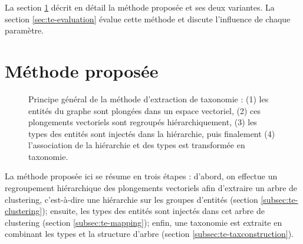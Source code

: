 La section \ref{sec:te-method} décrit en détail la méthode proposée et ses deux variantes. La section \ref{sec:te-evaluation} évalue cette méthode et discute l'influence de chaque paramètre.

\section{Méthode proposée}
\label{sec:te-method}

\begin{figure}[h]
    \centering
    
    \caption[Principe général de l'extraction de taxonomie]{Principe général de la méthode d'extraction de taxonomie : (1) les entités du graphe sont plongées dans un espace vectoriel, (2) ces plongements vectoriels sont regroupés hiérarchiquement, (3) les types des entités sont injectés dans la hiérarchie, puis finalement (4) l'association de la hiérarchie et des types est transformée en taxonomie.}
    \label{fig:te-summary}
\end{figure}

La méthode proposée ici se résume en trois étapes : d'abord, on effectue un regroupement hiérarchique des plongements vectoriels afin d'extraire un arbre de clustering, c'est-à-dire une hiérarchie sur les groupes d'entités (section \ref{subsec:te-clustering}); ensuite, les types des entités sont injectés dans cet arbre de clustering (section \ref{subsec:te-mapping}); enfin, une taxonomie est extraite en combinant les types et la structure d'arbre (section \ref{subsec:te-taxconstruction}). 




